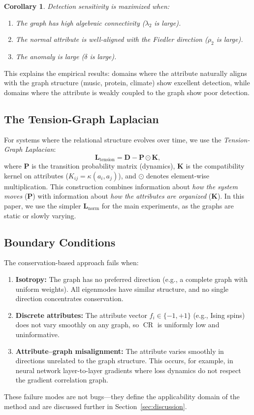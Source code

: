 \documentclass[11pt,a4paper]{article}
\newtheorem{corollary}[theorem]{Corollary}
\newcommand{\bL}{\mathbf{L}}
\newcommand{\bD}{\mathbf{D}}
\newcommand{\bP}{\mathbf{P}}
\newcommand{\bK}{\mathbf{K}}
\DeclareMathOperator{\CR}{CR}
\begin{document}
\begin{corollary}
Detection sensitivity is maximized when:
\begin{enumerate}
  \item The graph has high algebraic connectivity ($\lambda_2$ is large).
  \item The normal attribute is well-aligned with the Fiedler direction
        ($\rho_2$ is large).
  \item The anomaly is large ($\delta$ is large).
\end{enumerate}
\end{corollary}

This explains the empirical results: domains where the attribute naturally
aligns with the graph structure (music, protein, climate) show excellent
detection, while domains where the attribute is weakly coupled to the graph
show poor detection.

\subsection{The Tension-Graph Laplacian}

For systems where the relational structure evolves over time, we use the
\emph{Tension-Graph Laplacian}:
\begin{equation}\label{eq:tension-laplacian}
  \bL_{\mathrm{tension}} = \bD - \bP \odot \bK,
\end{equation}
where $\bP$ is the transition probability matrix (dynamics), $\bK$ is the
compatibility kernel on attributes ($K_{ij} = \kappa(a_i, a_j)$), and
$\odot$ denotes element-wise multiplication.  This construction combines
information about \emph{how the system moves} ($\bP$) with information about
\emph{how the attributes are organized} ($\bK$).  In this paper, we use the
simpler $\bL_{\mathrm{norm}}$ for the main experiments, as the graphs are
static or slowly varying.

\subsection{Boundary Conditions}

The conservation-based approach fails when:
\begin{enumerate}
  \item \textbf{Isotropy:} The graph has no preferred direction (e.g., a complete
        graph with uniform weights).  All eigenmodes have similar structure,
        and no single direction concentrates conservation.
  \item \textbf{Discrete attributes:} The attribute vector $f_i \in \{-1, +1\}$
        (e.g., Ising spins) does not vary smoothly on any graph, so $\CR$ is
        uniformly low and uninformative.
  \item \textbf{Attribute--graph misalignment:} The attribute varies smoothly
        in directions unrelated to the graph structure.  This occurs, for
        example, in neural network layer-to-layer gradients where loss
        dynamics do not respect the gradient correlation graph.
\end{enumerate}
These failure modes are not bugs---they define the applicability domain of the
method and are discussed further in Section~\ref{sec:discussion}.
\end{document}
